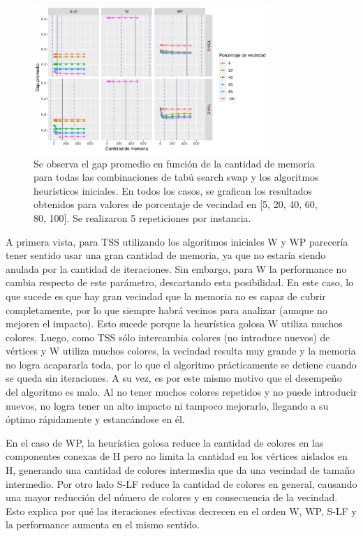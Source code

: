 \begin{figure}[H]
    \centering
    \includegraphics[width=0.8\textwidth]{plots/memoria_tss.png}
    \caption{Se observa el gap promedio en función de la cantidad de memoria para todas las combinaciones de tabú search swap y los algoritmos heurísticos iniciales. En todos los casos, se grafican los resultados obtenidos para valores de porcentaje de vecindad en [5, 20, 40, 60, 80, 100]. Se realizaron 5 repeticiones por instancia.}
    \label{plot:memoria tss}
\end{figure}

A primera vista, para TSS utilizando los algoritmos iniciales W y WP parecería tener sentido usar una gran cantidad de memoria, ya que no estaría siendo anulada por la cantidad de iteraciones. Sin embargo, para W la performance no cambia respecto de este parámetro, descartando esta posibilidad. En este caso, lo que sucede es que hay gran vecindad que la memoria no es capaz de cubrir completamente, por lo que siempre habrá vecinos para analizar (aunque no mejoren el impacto). Esto sucede porque la heurística golosa W utiliza muchos colores. Luego, como TSS sólo intercambia colores (no introduce nuevos) de vértices y W utiliza muchos colores, la vecindad resulta muy grande y la memoria no logra acapararla toda, por lo que el algoritmo prácticamente se detiene cuando se queda sin iteraciones. A su vez, es por este mismo motivo que el desempeño del algoritmo es malo. Al no tener muchos colores repetidos y no puede introducir nuevos, no logra tener un alto impacto ni tampoco mejorarlo, llegando a su óptimo rápidamente y estancándose en él.

En el caso de WP, la heurística golosa reduce la cantidad de colores en las componentes conexas de H pero no limita la cantidad en los vértices aislados en H, generando una cantidad de colores intermedia que da una vecindad de tamaño intermedio. Por otro lado S-LF reduce la cantidad de colores en general, causando una mayor reducción del número de colores y en consecuencia de la vecindad. Esto explica por qué las iteraciones efectivas decrecen en el orden W, WP, S-LF y la performance aumenta en el mismo sentido.

